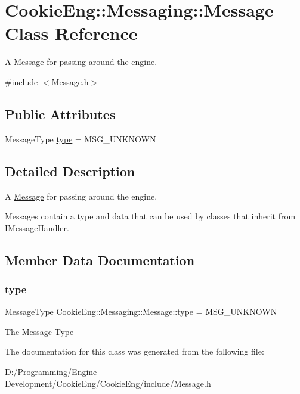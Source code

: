 \hypertarget{class_cookie_eng_1_1_messaging_1_1_message}{}\section{Cookie\+Eng\+:\+:Messaging\+:\+:Message Class Reference}
\label{class_cookie_eng_1_1_messaging_1_1_message}


A \hyperlink{class_cookie_eng_1_1_messaging_1_1_message}{Message} for passing around the engine.  




{\ttfamily \#include $<$Message.\+h$>$}

\subsection*{Public Attributes}
\begin{DoxyCompactItemize}
\item 
Message\+Type \hyperlink{class_cookie_eng_1_1_messaging_1_1_message_a84ceed50d5b23841c9ab49aa623207c1}{type} = M\+S\+G\+\_\+\+U\+N\+K\+N\+O\+WN
\end{DoxyCompactItemize}


\subsection{Detailed Description}
A \hyperlink{class_cookie_eng_1_1_messaging_1_1_message}{Message} for passing around the engine. 

Messages contain a type and data that can be used by classes that inherit from \hyperlink{class_cookie_eng_1_1_messaging_1_1_i_message_handler}{I\+Message\+Handler}. 

\subsection{Member Data Documentation}
\mbox{\label{class_cookie_eng_1_1_messaging_1_1_message_a84ceed50d5b23841c9ab49aa623207c1}} 
\subsubsection{\texorpdfstring{type}{type}}
{\footnotesize\ttfamily Message\+Type Cookie\+Eng\+::\+Messaging\+::\+Message\+::type = M\+S\+G\+\_\+\+U\+N\+K\+N\+O\+WN}

The \hyperlink{class_cookie_eng_1_1_messaging_1_1_message}{Message} Type 

The documentation for this class was generated from the following file\+:\begin{DoxyCompactItemize}
\item 
D\+:/\+Programming/\+Engine Development/\+Cookie\+Eng/\+Cookie\+Eng/include/Message.\+h\end{DoxyCompactItemize}
